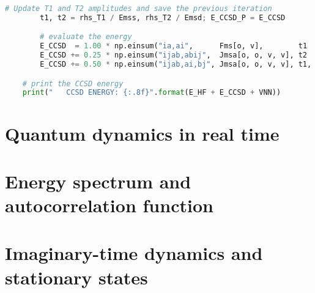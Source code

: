 \begin{lstlisting}[language=Python, caption={\acrshort{ccd} and \acrshort{ccsd} method exercise code solution.}, label=code:cc_solution]
        # Update T1 and T2 amplitudes and save the previous iteration
        t1, t2 = rhs_T1 / Emss, rhs_T2 / Emsd; E_CCSD_P = E_CCSD

        # evaluate the energy
        E_CCSD  = 1.00 * np.einsum("ia,ai",      Fms[o, v],        t1    )
        E_CCSD += 0.25 * np.einsum("ijab,abij",  Jmsa[o, o, v, v], t2    )
        E_CCSD += 0.50 * np.einsum("ijab,ai,bj", Jmsa[o, o, v, v], t1, t1)

    # print the CCSD energy
    print("   CCSD ENERGY: {:.8f}".format(E_HF + E_CCSD + VNN))
\end{lstlisting}


\section*{Quantum dynamics in real time}

\lstset{style=mystyle}


\section*{Energy spectrum and autocorrelation function}

\lstset{style=mystyle}


\section*{Imaginary-time dynamics and stationary states}

\lstset{style=mystyle}


